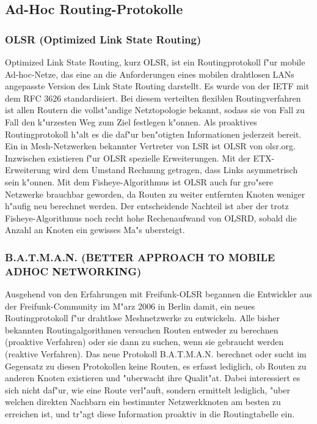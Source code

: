 \subsection{Ad-Hoc Routing-Protokolle}

\subsubsection{OLSR (Optimized Link State Routing)}

Optimized Link State Routing, kurz OLSR, ist ein Routingprotokoll
f"ur mobile Ad-hoc-Netze, das eine an die Anforderungen eines mobilen
drahtlosen LANs angepasste Version des Link State Routing darstellt. Es
wurde von der IETF mit dem RFC 3626 standardisiert. Bei diesem
verteilten flexiblen Routingverfahren ist allen Routern die vollst"andige
Netztopologie bekannt, sodass sie von Fall zu Fall den k"urzesten Weg zum
Ziel festlegen k"onnen. Als proaktives Routingprotokoll h"alt es die daf"ur
ben"otigten Informationen jederzeit bereit.   Ein in Mesh-Netzwerken
bekannter Vertreter von LSR ist OLSR von olsr.org. Inzwischen existieren
f"ur OLSR spezielle Erweiterungen. Mit der ETX-Erweiterung wird dem
Umstand Rechnung getragen, dass Links asymmetrisch sein k"onnen. Mit
dem Fisheye-Algorithmus ist OLSR auch fur gro"sere Netzwerke brauchbar
geworden, da Routen zu weiter entfernten Knoten weniger h"aufig neu
berechnet werden. Der entscheidende Nachteil ist aber der trotz
Fisheye-Algorithmus noch recht hohe Rechenaufwand von OLSRD, sobald
die Anzahl an Knoten ein gewisses Ma"s ubersteigt.

\subsubsection{B.A.T.M.A.N. (BETTER APPROACH TO MOBILE ADHOC NETWORKING)}

Ausgehend von den Erfahrungen mit Freifunk-OLSR begannen die Entwickler
aus der Freifunk-Community im M"arz 2006 in Berlin damit, ein neues
Routingprotokoll f"ur drahtlose Meshnetzwerke zu entwickeln. Alle bisher
bekannten Routingalgorithmen versuchen Routen entweder zu berechnen
(proaktive Verfahren) oder sie dann zu suchen, wenn sie gebraucht werden
(reaktive Verfahren). Das neue Protokoll B.A.T.M.A.N. berechnet oder
sucht im Gegensatz zu diesen Protokollen keine Routen, es erfasst
lediglich, ob Routen zu anderen Knoten existieren und "uberwacht ihre
Qualit"at. Dabei interessiert es sich nicht daf"ur, wie eine Route verl"auft,
sondern ermittelt lediglich, "uber welchen direkten Nachbarn ein bestimmter
Netzwerkknoten am besten zu erreichen ist, und tr"agt diese Information
proaktiv in die Routingtabelle ein. 

